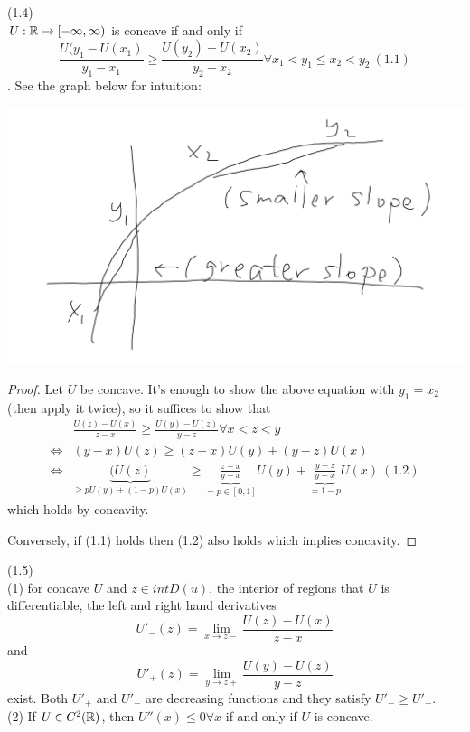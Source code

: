 \documentclass[a4paper]{article}
\begin{document}
\begin{prop} (1.4)\\
$U:\mathbb{R} \to [-\infty,\infty)$ is concave if and only if $$\frac{U(y_1 - U(x_1)}{y_1-x_1} \geq \frac{U(y_2) - U(x_2)}{y_2-x_2} \forall x_1 < y_1 \leq x_2 < y_2 \ (1.1)$$ . See the graph below for intuition:

\includegraphics[scale=0.5]{image/SFM_01.png}

\begin{proof}
Let $U$ be concave. It's enough to show the above equation with $y_1 = x_2$ (then apply it twice), so it suffices to show that 
\begin{equation*}
\begin{aligned}
&\frac{U(z) - U(x)}{z-x} \geq \frac{U(y) - U(z)}{y-z} \forall x < z <y\\
\iff &(y-x)U(z) \geq (z-x) U(y) + (y-z)U(x)\\
\iff &\underbrace{(U(z)}_{\geq pU(y)+(1-p)U(x)} \geq \underbrace{\frac{z-x}{y-x}}_{=p \in [0,1]} U(y) + \underbrace{\frac{y-z}{y-x}}_{=1-p} U(x) \ (1.2)
\end{aligned}
\end{equation*}
which holds by concavity.

Conversely, if (1.1) holds then (1.2) also holds which implies concavity.
\end{proof}
\end{prop}

\begin{coro} (1.5)\\
(1) for concave $U$ and $z \in int D(u)$, the interior of regions that $U$ is differentiable, the left and right hand derivatives $$U'_{-}(z) = \lim_{x \to z-} \frac{U(z) - U(x)}{z-x}$$ and $$U'_{+}(z) = \lim_{y \to z+} \frac{U(y) - U(z)}{y-z}$$ exist. Both $U'_+$ and $U'_-$ are decreasing functions and they satisfy $U'_- \geq U'_+$.\\
(2) If $U \in C^2(\mathbb{R})$, then $U''(x) \leq 0 \forall x$ if and only if $U$ is concave.
\end{coro}
\end{document}
